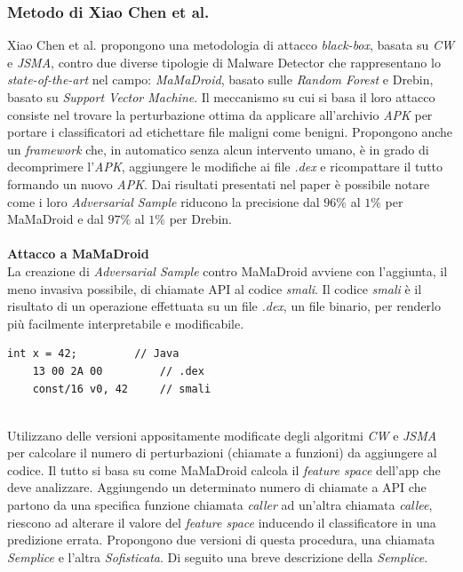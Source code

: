 \subsubsection{Metodo di Xiao Chen et al.}
Xiao Chen et al.\cite{hiv} propongono una metodologia di attacco \textit{black-box}, basata su \textit{CW} e \textit{JSMA}, contro due diverse tipologie di Malware Detector che rappresentano lo \textit{state-of-the-art} nel campo: \textit{MaMaDroid}, basato sulle \textit{Random Forest} e Drebin, basato su \textit{Support Vector Machine}.
Il meccanismo su cui si basa il loro attacco consiste nel trovare la perturbazione ottima da applicare all'archivio \textit{APK} per portare i classificatori ad etichettare file maligni come benigni.
Propongono anche un \textit{framework} che, in automatico senza alcun intervento umano, è in grado di decomprimere l'\textit{APK}, aggiungere le modifiche ai file \textit{.dex} e ricompattare il tutto formando un nuovo \textit{APK}. Dai risultati presentati nel paper è possibile notare come i loro \textit{Adversarial Sample} riducono la precisione dal \(96\%\) al \(1\%\) per MaMaDroid\cite{hiv} e dal \(97\%\) al \(1\%\) per Drebin\cite{hiv}.\\
\\
\textbf{Attacco a MaMaDroid}\\
La creazione di \textit{Adversarial Sample} contro MaMaDroid avviene con l'aggiunta, il meno invasiva possibile, di chiamate API al codice \textit{smali}.
Il codice \textit{smali} è il risultato di un operazione effettuata su un file \textit{.dex}, un file binario, per renderlo più facilmente interpretabile e modificabile.\\

\begin{lstlisting}[caption=Esempio di formati dex e smali. La riga 1 rappresenta il codice originale scritto in Java. La riga 2 è il contenuto dello stesso codice compilato in formato dex. La riga 3 è il codice smali ottenuto dalla conversione del file dex.]
    int x = 42;         // Java
    13 00 2A 00         // .dex
    const/16 v0, 42     // smali
\end{lstlisting}
\ \\
Utilizzano delle versioni appositamente modificate degli algoritmi \textit{CW} e \textit{JSMA} per calcolare il numero di perturbazioni (chiamate a funzioni) da aggiungere al codice. %
Il tutto si basa su come MaMaDroid calcola il \textit{feature space} dell'app che deve analizzare. Aggiungendo un determinato numero di chiamate a API che partono da una specifica funzione chiamata \textit{caller} ad un'altra chiamata \textit{callee}, riescono ad alterare il valore del \textit{feature space} inducendo il classificatore in una predizione errata. Propongono due versioni di questa procedura, una chiamata \textit{Semplice} e l'altra \textit{Sofisticata}. Di seguito una breve descrizione della \textit{Semplice}.\\

